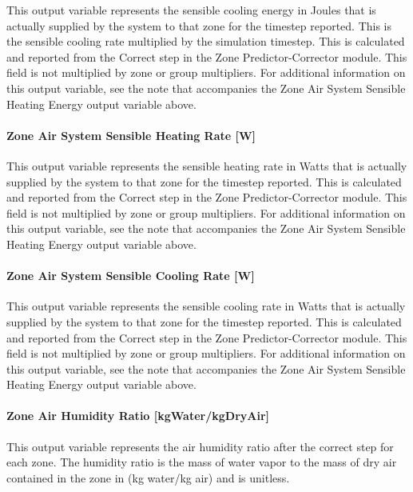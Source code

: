 This output variable represents the sensible cooling energy in Joules that is actually supplied by the system to that zone for the timestep reported. This is the sensible cooling rate multiplied by the simulation timestep. This is calculated and reported from the Correct step in the Zone Predictor-Corrector module. This field is not multiplied by zone or group multipliers. For additional information on this output variable, see the note that accompanies the Zone Air System Sensible Heating Energy output variable above.

\paragraph{Zone Air System Sensible Heating Rate {[}W{]}}\label{zone-air-system-sensible-heating-rate-w}

This output variable represents the sensible heating rate in Watts that is actually supplied by the system to that zone for the timestep reported. This is calculated and reported from the Correct step in the Zone Predictor-Corrector module. This field is not multiplied by zone or group multipliers. For additional information on this output variable, see the note that accompanies the Zone Air System Sensible Heating Energy output variable above.

\paragraph{Zone Air System Sensible Cooling Rate {[}W{]}}\label{zone-air-system-sensible-cooling-rate-w}

This output variable represents the sensible cooling rate in Watts that is actually supplied by the system to that zone for the timestep reported. This is calculated and reported from the Correct step in the Zone Predictor-Corrector module. This field is not multiplied by zone or group multipliers. For additional information on this output variable, see the note that accompanies the Zone Air System Sensible Heating Energy output variable above.

\paragraph{Zone Air Humidity Ratio {[}kgWater/kgDryAir{]}}\label{zone-air-humidity-ratio-kgwaterkgdryair}

This output variable represents the air humidity ratio after the correct step for each zone. The humidity ratio is the mass of water vapor to the mass of dry air contained in the zone in (kg water/kg air) and is unitless.

